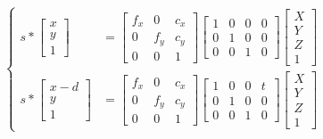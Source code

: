 \documentclass[titlepage,11pt,a4paper]{article}
\begin{document}
\begin{displaymath}
	\begin{split}
	\left\lbrace
	\begin{array}{cc}
	s * 
		\begin{bmatrix}
			x \\
			y \\
			1
		\end{bmatrix}
		 &=
		\begin{bmatrix}
			f_{x} & 0 & c_{x} \\
			0 & f_{y} & c_{y} \\
			0 & 0 & 1
		\end{bmatrix}
		\begin{bmatrix}
			1 & 0 & 0 & 0 \\
			0 & 1 & 0 & 0 \\
			0 & 0 & 1 & 0
		\end{bmatrix}
		\begin{bmatrix}
			X \\
			Y \\
			Z \\
			1
		\end{bmatrix}
		\\
	s * 
		\begin{bmatrix}
			x - d \\
			y \\
			1
		\end{bmatrix}
		 &=
		\begin{bmatrix}
			f_{x} & 0 & c_{x} \\
			0 & f_{y} & c_{y} \\
			0 & 0 & 1
		\end{bmatrix}
		\begin{bmatrix}
			1 & 0 & 0 & t \\
			0 & 1 & 0 & 0 \\
			0 & 0 & 1 & 0
		\end{bmatrix}
		\begin{bmatrix}
			X \\
			Y \\
			Z \\
			1
		\end{bmatrix}
	\end{array}\right.
	\end{split}
\end{displaymath}
\end{document}
